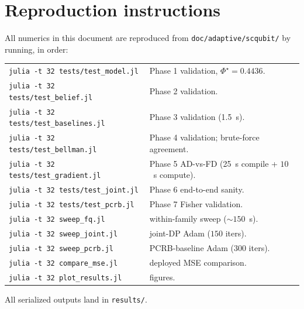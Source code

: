 \documentclass[11pt,a4paper]{article}
\begin{document}
\appendix

\section{Reproduction instructions}
\label{app:reproduce}
All numerics in this document are reproduced from \texttt{doc/adaptive/scqubit/} by running, in order:
\begin{center}
\begin{tabular}{@{}ll@{}}
\toprule
\texttt{julia -t 32 tests/test\_model.jl}       & Phase 1 validation, $\Phi^\star = 0.4436$. \\
\texttt{julia -t 32 tests/test\_belief.jl}       & Phase 2 validation. \\
\texttt{julia -t 32 tests/test\_baselines.jl}    & Phase 3 validation (1.5~s). \\
\texttt{julia -t 32 tests/test\_bellman.jl}      & Phase 4 validation; brute-force agreement. \\
\texttt{julia -t 32 tests/test\_gradient.jl}     & Phase 5 AD-vs-FD (25~s compile + $10$~s compute). \\
\texttt{julia -t 32 tests/test\_joint.jl}        & Phase 6 end-to-end sanity. \\
\texttt{julia -t 32 tests/test\_pcrb.jl}         & Phase 7 Fisher validation. \\
\midrule
\texttt{julia -t 32 sweep\_fq.jl}                & within-family sweep ($\sim 150$~s). \\
\texttt{julia -t 32 sweep\_joint.jl}             & joint-DP Adam ($150$ iters). \\
\texttt{julia -t 32 sweep\_pcrb.jl}              & PCRB-baseline Adam ($300$ iters). \\
\texttt{julia -t 32 compare\_mse.jl}             & deployed MSE comparison. \\
\texttt{julia -t 32 plot\_results.jl}            & figures. \\
\bottomrule
\end{tabular}
\end{center}
All serialized outputs land in \texttt{results/}.
\end{document}
